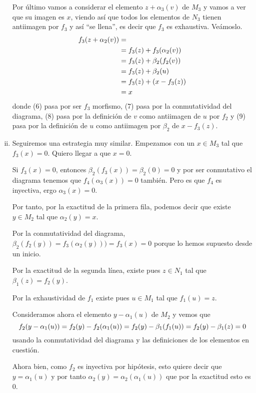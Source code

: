 \documentclass[../../../main.tex]{subfiles}
\begin{document}
\begin{sol}
\begin{enumerate}[(i)]
    Por último vamos a considerar el elemento $z+\alpha_3(v)$ de $M_3$ y vamos a ver que su imagen es $x$, viendo así que todos los elementos de $N_3$ tienen antiimagen por $f_3$ y así ``se llena'', es decir que $f_3$ es exhaustiva. Veámoslo.
    \begin{align}
        \notag
        f_3(z+\alpha_2(v)) & = \\
        &= f_3(z)+f_3(\alpha_2(v)) \\
        &= f_3(z)+\beta_2(f_2(v)) \\
        &= f_3(z) + \beta_2(u) \\
        &= f_3(z)+(x-f_3(z)) \\
        &= x
    \end{align}
    donde (6) pasa por ser $f_3$ morfismo, (7) pasa por la conmutatividad del diagrama, (8) pasa por la definición de $v$ como antiimagen de $u$ por $f_2$ y (9) pasa por la definición de $u$ como antiimagen por $\beta_2$ de $x-f_3(z)$.
    
    \item Seguiremos una estrategia muy similar. Empezamos con un $x\in M_3$ tal que $f_3(x) = 0$. Quiero llegar a que $x = 0$.
    
    Si $f_3(x) = 0$, entonces $\beta_2(f_3(x)) = \beta_2(0) = 0$ y por ser conmutativo el diagrama tenemos que $f_4(\alpha_3(x)) = 0$ también. Pero es que $f_4$ es inyectiva, ergo $\alpha_3(x) = 0$.
    
    Por tanto, por la exactitud de la primera fila, podemos decir que existe $y\in M_2$ tal que $\alpha_2(y) = x$. 
    
    Por la conmutatividad del diagrama, $\beta_2(f_2(y)) = f_3(\alpha_2(y))) = f_3(x) = 0$ porque lo hemos supuesto desde un inicio.
    
    Por la exactitud de la segunda línea, existe pues $z\in N_1$ tal que $\beta_1(z) = f_2(y)$.
    
    Por la exhaustividad de $f_1$ existe pues $u\in M_1$ tal que $f_1(u) = z$.
    
    Consideramos ahora el elemento $y-\alpha_1(u)$ de $M_2$ y vemos que
    \begin{equation}
        \notag
        f_2(y-\alpha_1(u)) = f_2(y)-f_2(\alpha_1(u)) = f_2(y)-\beta_1(f_1(u))=f_2(y)-\beta_1(z) = 0
    \end{equation}
    usando la conmutatividad del diagrama y las definiciones de los elementos en cuestión.
    
    Ahora bien, como $f_2$ es inyectiva por hipótesis, esto quiere decir que $y = \alpha_1(u)$ y por tanto $\alpha_2(y) = \alpha_2(\alpha_1(u))$ que por la exactitud esto es 0.
    

\end{enumerate}
\end{sol}
\end{document}
